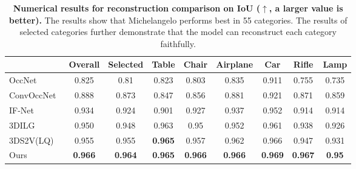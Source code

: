 \documentclass[../../book-main.tex]{subfiles}
\begin{document}
\begin{table}[t]
\centering
\resizebox{1\columnwidth}{!}
{
    \begin{tabular}{lcccccccc}
        \toprule
        & Overall & Selected & Table & Chair & Airplane & Car & Rifle
        & Lamp   \\ \midrule
        OccNet~\citep{8953655}
        & 0.825 & 0.81 & 0.823 & 0.803 & 0.835 & 0.911 & 0.755 & 0.735  \\
        ConvOccNet~\citep{10.1007/978-3-030-58580-8_31}
        & 0.888 & 0.873 & 0.847 & 0.856 & 0.881 & 0.921 & 0.871 & 0.859  \\
        IF-Net~\citep{9156292}
        & 0.934 & 0.924 & 0.901 & 0.927 & 0.937 & 0.952 & 0.914 & 0.914 \\
        3DILG~\citep{NEURIPS2022_894ca1c4}
        & 0.950 & 0.948 & 0.963 & 0.95 & 0.952 & 0.961 & 0.938 & 0.926 \\
        3DS2V(LQ)~\citep{10.1145/3592442}
        & 0.955 & 0.955 & \textbf{0.965} & 0.957 & 0.962 & 0.966 &
        0.947 & 0.931 \\
        Ours
        & \textbf{0.966} & \textbf{0.964} & \textbf{0.965} &
        \textbf{0.966} & \textbf{0.966} & \textbf{0.969} &
        \textbf{0.967} & \textbf{0.95} \\ \bottomrule
    \end{tabular}
}
\caption{\small\textbf{Numerical results for reconstruction comparison on
    IoU (\(\uparrow\), a larger value is better).}
The results show that
    Michelangelo performs best in 55 categories.
The results of selected
    categories further demonstrate that the model can reconstruct each
category faithfully.}
\label{tab:michelangelo_recon}
\end{table}
\end{document}
